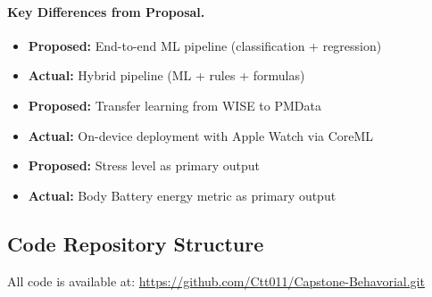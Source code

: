 \documentclass[12pt,letterpaper]{article}
\begin{document}
\paragraph{Key Differences from Proposal.}
\begin{itemize}
    \item \textbf{Proposed:} End-to-end ML pipeline (classification + regression)
    \item \textbf{Actual:} Hybrid pipeline (ML + rules + formulas)
    \item \textbf{Proposed:} Transfer learning from WISE to PMData
    \item \textbf{Actual:} On-device deployment with Apple Watch via CoreML
    \item \textbf{Proposed:} Stress level as primary output
    \item \textbf{Actual:} Body Battery energy metric as primary output
\end{itemize}



\newpage       
\subsection{Code Repository Structure}

All code is available at: \url{https://github.com/Ctt011/Capstone-Behavorial.git}
\end{document}
